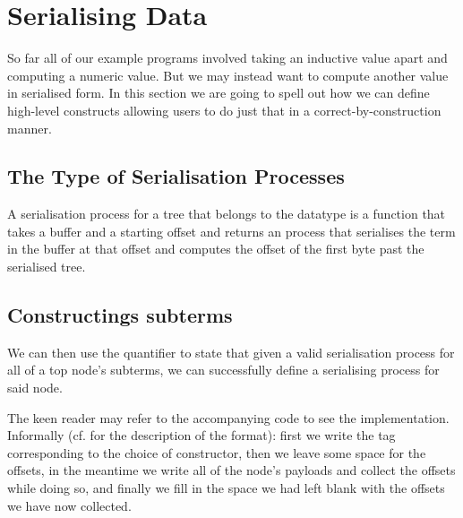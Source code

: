 \section{Serialising Data}\label{sec:serialising}

So far all of our example programs involved taking an inductive value
apart and computing a numeric value.
%
But we may instead want to compute another value in serialised form.
%
In this section we are going to spell out how we can define high-level
constructs allowing users to do just that in a correct-by-construction
manner.



\label{fig:serialised-map}


\subsection{The Type of Serialisation Processes}

A serialisation process for a tree  that belongs to the
datatype  is a function that takes a buffer
and a starting offset and returns an  process that
serialises the term in the buffer at that offset and computes the
offset of the first byte past the serialised tree.



\subsection{Constructings subterms}


We can then use the  quantifier to state that given a
valid serialisation process for all of a top node's subterms, we can
successfully define a serialising process for said node.


The keen reader may refer to the accompanying code to see the implementation.
Informally (cf.  for the description of the format):
first we write the tag corresponding to the choice of constructor,
then we leave some space for the offsets,
in the meantime we write all of the node's payloads and collect the offsets while doing so,
and finally we fill in the space we had left blank with the offsets we have now collected.

